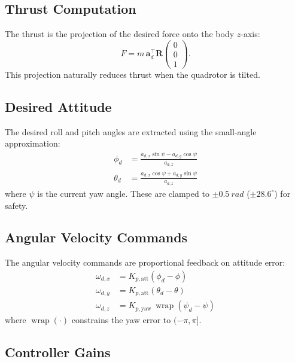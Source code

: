 \documentclass[journal]{IEEEtran}
\newcommand{\R}{\mathbf{R}}
\newcommand{\wrap}{\operatorname{wrap}}
\begin{document}
\subsection{Thrust Computation}

The thrust is the projection of the desired force onto the body $z$-axis:
\begin{equation}
  F = m \, \mathbf{a}_d^\top \R \begin{pmatrix} 0 \\ 0 \\ 1 \end{pmatrix}.
  \label{eq:thrust_proj}
\end{equation}
This projection naturally reduces thrust when the quadrotor is tilted.

\subsection{Desired Attitude}

The desired roll and pitch angles are extracted using the small-angle approximation:
\begin{align}
  \phi_d   &= \frac{a_{d,x} \sin\psi - a_{d,y} \cos\psi}{a_{d,z}} \label{eq:roll_des} \\
  \theta_d &= \frac{a_{d,x} \cos\psi + a_{d,y} \sin\psi}{a_{d,z}} \label{eq:pitch_des}
\end{align}
where $\psi$ is the current yaw angle. These are clamped to $\pm \SI{0.5}{rad}$ ($\pm 28.6^\circ$) for safety.

\subsection{Angular Velocity Commands}

The angular velocity commands are proportional feedback on attitude error:
\begin{align}
  \omega_{d,x} &= K_{p,\text{att}} (\phi_d - \phi) \label{eq:wx_cmd} \\
  \omega_{d,y} &= K_{p,\text{att}} (\theta_d - \theta) \label{eq:wy_cmd} \\
  \omega_{d,z} &= K_{p,\text{yaw}} \, \wrap(\psi_d - \psi) \label{eq:wz_cmd}
\end{align}
where $\wrap(\cdot)$ constrains the yaw error to $(-\pi, \pi]$.

\subsection{Controller Gains}
\end{document}
